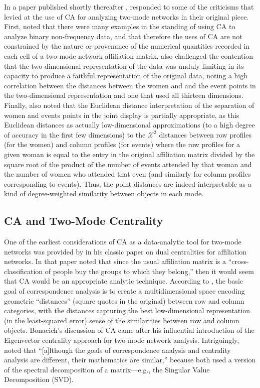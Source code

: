 \documentclass[a4paper,fleqn]{cas-sc}
\begin{document}
In a paper published shortly thereafter \citet{roberts2000correspondence}, responded to some of the criticisms that \citet{borgatti1997network} levied at the use of CA for analyzing two-mode networks in their original piece. First, \citet{roberts2000correspondence} noted that there were many examples in the standing of using CA to analyze binary non-frequency data, and that therefore the uses of CA are not constrained by the nature or provenance of the numerical quantities recorded in each cell of a two-mode network affiliation matrix. \citet{roberts2000correspondence} also challenged the contention that the two-dimensional representation of the data was unduly limiting in its capacity to produce a faithful representation of the original data, noting a high correlation between the distances between the women and and the event points in the two-dimensional representation and one that used all thirteen dimensions. Finally, \citet{roberts2000correspondence} also noted that the Euclidean distance interpretation of the separation of women and events points in the joint display is partially appropriate, as this Euclidean distances as actually low-dimensional approximations (to a high degree of accuracy in the first few dimensions) to the $\mathcal{X}^2$ distances between row profiles (for the women) and column profiles (for events) where the row profiles for a given woman is equal to the entry in the original affiliation matrix divided by the square root of the product of the number of events attended by that woman and the number of women who attended that even (and similarly for column profiles corresponding to events). Thus, the point distances are indeed interpretable as a kind of degree-weighted similarity between objects in each mode.  

\subsection{CA and Two-Mode Centrality}
One of the earliest considerations of CA as a data-analytic tool for two-mode networks was provided by \citet[163-165]{bonacich1991simultaneous} in his classic paper on dual centralities for affiliation networks. In that paper \citet{bonacich1991simultaneous} noted that since the usual affiliation matrix is a ``cross-classification of people buy the groups to which they belong,'' then it would seem that CA would be an appropriate analytic technique. According to \citet{bonacich1991simultaneous}, the basic goal of correspondence analysis is to create a multidimensional space encoding geometric ``distances'' (square quotes in the original) between row and column categories, with the distances capturing the best low-dimensional representation (in the least-squared error) sense of the similarities between row and column objects.  Bonacich's discussion of CA came after his influential introduction of the Eigenvector centrality approach for two-mode network analysis. Intriguingly, \citet[163]{bonacich1991simultaneous} noted that ``[a]lthough the goals of correspondence analysis and centrality analysis are different, their mathematics are similar,'' because both used a version of the spectral decomposition of a matrix---e.g., the Singular Value Decomposition (SVD). 
\end{document}

